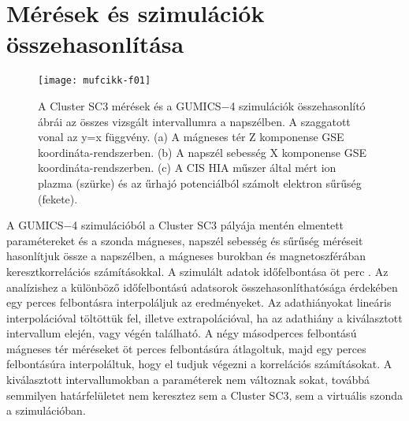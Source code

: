 \documentclass[b5paper,10pt]{article}
\begin{document}
\section*{Mérések és szimulációk összehasonlítása}
\label{sec:osszehasonlitas}

\begin{figure}[t]
\centering
\texttt{[image: mufcikk-f01]}
\caption{A Cluster SC3 mérések és a GUMICS$-$4 szimulációk összehasonlító ábrái az összes vizsgált intervallumra a napszélben. A szaggatott vonal az y=x függvény. (a) A mágneses tér Z komponense GSE koordináta-rendszerben. (b) A napszél sebesség X komponense GSE koordináta-rendszerben. (c) A CIS HIA műszer által mért ion plazma (szürke) és az űrhajó potenciálból számolt elektron sűrűség (fekete).}
\label{fig:swscatplot}
\end{figure}

A GUMICS$-$4 szimulációból a Cluster SC3 pályája mentén elmentett paramétereket és a szonda mágneses, napszél sebesség és sűrűség méréseit hasonlítjuk össze a napszélben, a mágneses burokban és magnetoszférában keresztkorrelációs számításokkal. A szimulált adatok időfelbontása öt perc \cite{facsko16:_one_earth}. Az analízishez a különböző időfelbontású adatsorok összehasonlíthatósága érdekében egy perces felbontásra interpoláljuk az eredményeket. Az adathiányokat lineáris interpolációval töltöttük fel, illetve extrapolációval, ha az adathiány a kiválasztott intervallum elején, vagy végén található. A négy másodperces felbontású mágneses tér méréseket öt perces felbontásúra átlagoltuk, majd egy perces felbontásúra interpoláltuk, hogy el tudjuk végezni a korrelációs számításokat. A kiválasztott intervallumokban a paraméterek nem változnak sokat, továbbá semmilyen határfelületet nem keresztez sem a Cluster SC3, sem a virtuális szonda a szimulációban. 
\end{document}
